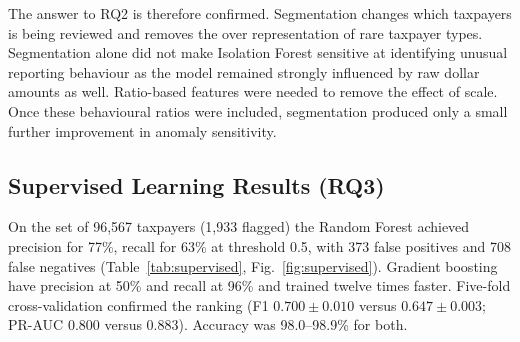 The answer to RQ2 is therefore confirmed. Segmentation changes which taxpayers is being reviewed and removes the over representation of rare taxpayer types. Segmentation alone did not make Isolation Forest sensitive at identifying unusual reporting behaviour as the model remained strongly influenced by raw dollar amounts as well. Ratio-based features were needed to remove the effect of scale. Once these behavioural ratios were included, segmentation produced only a small further improvement in anomaly sensitivity.

\subsection{Supervised Learning Results (RQ3)}

On the set of 96,567 taxpayers (1,933 flagged) the Random Forest achieved precision for 77\%, recall for 63\% at threshold 0.5, with 373 false positives and 708 false negatives (Table~\ref{tab:supervised}, Fig.~\ref{fig:supervised}). Gradient boosting have precision at 50\% and recall at 96\% and trained twelve times faster. Five-fold cross-validation confirmed the ranking (F1 $0.700 \pm 0.010$ versus $0.647 \pm 0.003$; PR-AUC 0.800 versus 0.883). Accuracy was 98.0--98.9\% for both.

\begin{table}[H]
    \centering
    \caption{Supervised classification of Isolation Forest flags on the hold-out set.}
    \label{tab:supervised}
    \footnotesize
\end{table}

